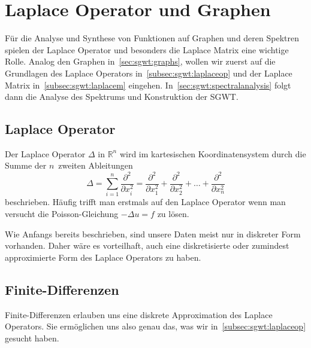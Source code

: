 
\section{Laplace Operator und Graphen\label{sec:sgwt:laplace}}

F\"ur die Analyse und Synthese von Funktionen auf Graphen und deren Spektren 
spielen der Laplace Operator und besonders die Laplace Matrix eine wichtige 
Rolle. Analog den Graphen in~\cref{sec:sgwt:graphs}, wollen wir zuerst 
auf die Grundlagen des Laplace Operators in~\cref{subsec:sgwt:laplaceop} und 
der Laplace Matrix \laplaceL{} in~\cref{subsec:sgwt:laplacem} eingehen. 
In~\cref{sec:sgwt:spectralanalysis} folgt dann die Analyse des Spektrums und 
Konstruktion der SGWT.

\subsection{Laplace Operator\label{subsec:sgwt:laplaceop}}

Der Laplace Operator $\Delta$ in $\mathbb{R}^n$ wird im kartesischen 
Koordinatensystem durch die Summe der $n$~zweiten Ableitungen
\begin{equation*}
\Delta = 
\sum_{i = 1}^{n}\frac{\partial^2}{\partial x_i^2}
=
\frac{\partial^2}{\partial x_1^2}
+ \frac{\partial^2}{\partial x_2^2}
+ \dots
+ \frac{\partial^2}{\partial x_n^2}
\end{equation*}
beschrieben. H\"aufig trifft man erstmals auf den Laplace Operator wenn man 
versucht die Poisson-Gleichung $-\Delta u = f$ zu l\"osen.

Wie Anfangs bereits beschrieben, sind unsere Daten meist nur in diskreter Form 
vorhanden. Daher w\"are es vorteilhaft, auch eine diskretisierte oder zumindest 
approximierte Form des Laplace Operators zu haben.

\subsection{Finite-Differenzen}

Finite-Differenzen erlauben uns eine diskrete Approximation des 
Laplace Operators. Sie erm\"oglichen uns also genau das, was wir 
in~\cref{subsec:sgwt:laplaceop} gesucht haben.

